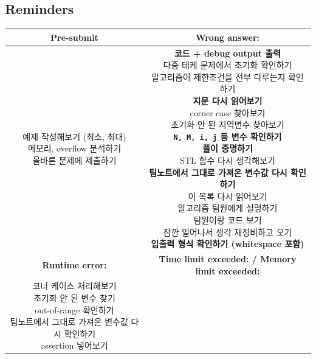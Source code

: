 \documentclass[landscape, 8pt, a4paper, oneside, twocolumn]{extarticle}
\begin{document}
\subsection*{Reminders}

\begin{table}[H]
    \centering
    \begin{tabular}{|c|c|}
        \hline
        \textbf{Pre-submit} & \textbf{Wrong answer:} \\ \hline
        \makecell{
            예제 작성해보기 (최소, 최대)\\
            메모리, overflow 분석하기 \\
            올바른 문제에 제출하기
        } &
        \makecell{
            \textbf{코드 + debug output 출력} \\
            다중 테케 문제에서 초기화 확인하기 \\
            알고리즘이 제한조건을 전부 다루는지 확인하기 \\
            \textbf{지문 다시 읽어보기} \\ 
            corner case 찾아보기 \\
            초기화 안 된 지역변수 찾아보기 \\
            \textbf{\texttt{N, M, i, j} 등 변수 확인하기} \\
            \textbf{풀이 증명하기} \\
            STL 함수 다시 생각해보기 \\
            \textbf{팀노트에서 그대로 가져온 변수값 다시 확인하기} \\
            이 목록 다시 읽어보기 \\
            알고리즘 팀원에게 설명하기 \\
            팀원이랑 코드 보기 \\
            잠깐 일어나서 생각 재정비하고 오기 \\
            \textbf{입출력 형식 확인하기 (whitespace 포함)}
        } \\ \hline
        \textbf{Runtime error:} & \textbf{Time limit exceeded: / Memory limit exceeded:} \\ \hline
        \makecell{
            코너 케이스 처리해보기 \\
            초기화 안 된 변수 찾기 \\
            out-of-range 확인하기 \\
            팀노트에서 그대로 가져온 변수값 다시 확인하기 \\ 
            assertion 넣어보기 \\
}
\end{tabular}
\end{table}
\end{document}
